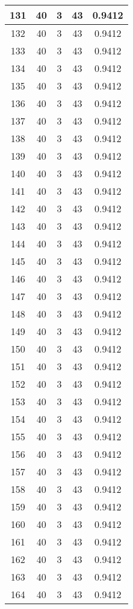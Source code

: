 \documentclass[letterpaper, 12pt]{article}
\begin{document}
\begin{longtable}{|c|c|c|c|c|}
\hline
131 & 40 & 3 & 43 & 0.9412 \\
\hline
132 & 40 & 3 & 43 & 0.9412 \\
\hline
133 & 40 & 3 & 43 & 0.9412 \\
\hline
134 & 40 & 3 & 43 & 0.9412 \\
\hline
135 & 40 & 3 & 43 & 0.9412 \\
\hline
136 & 40 & 3 & 43 & 0.9412 \\
\hline
137 & 40 & 3 & 43 & 0.9412 \\
\hline
138 & 40 & 3 & 43 & 0.9412 \\
\hline
139 & 40 & 3 & 43 & 0.9412 \\
\hline
140 & 40 & 3 & 43 & 0.9412 \\
\hline
141 & 40 & 3 & 43 & 0.9412 \\
\hline
142 & 40 & 3 & 43 & 0.9412 \\
\hline
143 & 40 & 3 & 43 & 0.9412 \\
\hline
144 & 40 & 3 & 43 & 0.9412 \\
\hline
145 & 40 & 3 & 43 & 0.9412 \\
\hline
146 & 40 & 3 & 43 & 0.9412 \\
\hline
147 & 40 & 3 & 43 & 0.9412 \\
\hline
148 & 40 & 3 & 43 & 0.9412 \\
\hline
149 & 40 & 3 & 43 & 0.9412 \\
\hline
150 & 40 & 3 & 43 & 0.9412 \\
\hline
151 & 40 & 3 & 43 & 0.9412 \\
\hline
152 & 40 & 3 & 43 & 0.9412 \\
\hline
153 & 40 & 3 & 43 & 0.9412 \\
\hline
154 & 40 & 3 & 43 & 0.9412 \\
\hline
155 & 40 & 3 & 43 & 0.9412 \\
\hline
156 & 40 & 3 & 43 & 0.9412 \\
\hline
157 & 40 & 3 & 43 & 0.9412 \\
\hline
158 & 40 & 3 & 43 & 0.9412 \\
\hline
159 & 40 & 3 & 43 & 0.9412 \\
\hline
160 & 40 & 3 & 43 & 0.9412 \\
\hline
161 & 40 & 3 & 43 & 0.9412 \\
\hline
162 & 40 & 3 & 43 & 0.9412 \\
\hline
163 & 40 & 3 & 43 & 0.9412 \\
\hline
164 & 40 & 3 & 43 & 0.9412 \\

\end{longtable}
\end{document}
